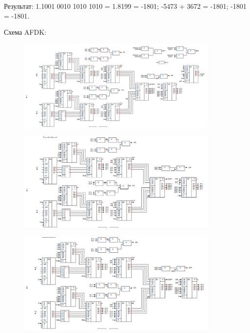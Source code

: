 \documentclass[12pt,a4paper]{article}
\begin{document}
    Результат: 1.1001 0010 1010 1010 = 1.8199 = -1801; -5473 + 3672 = -1801; -1801 = -1801.

    \vspace{1em}

    Схема AFDK:

    \begin{figure}[ht]
        \centering
        \includegraphics[width=0.89\textwidth]{1_1.png}
    \end{figure}

    \begin{figure}[ht]
        \centering
        \includegraphics[width=0.89\textwidth]{1_2.png}
    \end{figure}

    \newpage

    \begin{figure}[ht]
        \centering
        \includegraphics[width=0.89\textwidth]{1_3.png}
    \end{figure}
\end{document}
